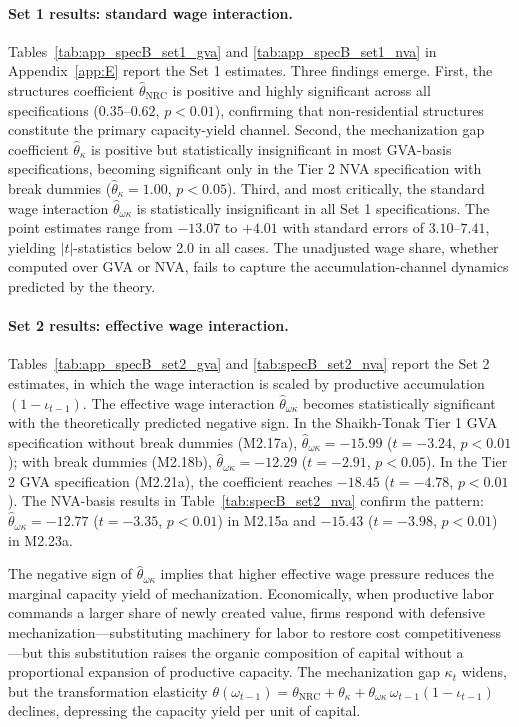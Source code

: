 \paragraph{Set 1 results: standard wage interaction.}
Tables~\ref{tab:app_specB_set1_gva} and
\ref{tab:app_specB_set1_nva} in Appendix~\ref{app:E} report the
Set 1 estimates. Three findings emerge. First, the structures
coefficient $\hat{\theta}_{\text{NRC}}$ is positive and highly
significant across all specifications ($0.35$--$0.62$,
$p < 0.01$), confirming that non-residential structures constitute
the primary capacity-yield channel. Second, the mechanization gap
coefficient $\hat{\theta}_{\kappa}$ is positive but statistically
insignificant in most GVA-basis specifications, becoming significant
only in the Tier 2 NVA specification with break dummies
($\hat{\theta}_{\kappa} = 1.00$, $p < 0.05$). Third, and most
critically, the standard wage interaction
$\hat{\theta}_{\omega\kappa}$ is statistically insignificant in all
Set 1 specifications. The point estimates range from $-13.07$ to
$+4.01$ with standard errors of $3.10$--$7.41$, yielding
$|t|$-statistics below 2.0 in all cases. The unadjusted wage share,
whether computed over GVA or NVA, fails to capture the
accumulation-channel dynamics predicted by the theory.

\paragraph{Set 2 results: effective wage interaction.}
Tables~\ref{tab:app_specB_set2_gva} and
\ref{tab:specB_set2_nva} report the Set 2 estimates, in which the
wage interaction is scaled by productive accumulation
$(1 - \iota_{t-1})$. The effective wage interaction
$\hat{\theta}_{\omega\kappa}$ becomes statistically significant
with the theoretically predicted negative sign. In the
Shaikh-Tonak Tier 1 GVA specification without break dummies
(M2.17a), $\hat{\theta}_{\omega\kappa} = -15.99$ ($t = -3.24$,
$p < 0.01$); with break dummies (M2.18b),
$\hat{\theta}_{\omega\kappa} = -12.29$ ($t = -2.91$,
$p < 0.05$). In the Tier 2 GVA specification (M2.21a), the
coefficient reaches $-18.45$ ($t = -4.78$, $p < 0.01$). The
NVA-basis results in Table~\ref{tab:specB_set2_nva} confirm the
pattern: $\hat{\theta}_{\omega\kappa} = -12.77$ ($t = -3.35$,
$p < 0.01$) in M2.15a and $-15.43$ ($t = -3.98$, $p < 0.01$) in
M2.23a.

The negative sign of $\hat{\theta}_{\omega\kappa}$ implies that
higher effective wage pressure reduces the marginal capacity yield
of mechanization. Economically, when productive labor commands a
larger share of newly created value, firms respond with defensive
mechanization---substituting machinery for labor to restore cost
competitiveness---but this substitution raises the organic
composition of capital without a proportional expansion of
productive capacity. The mechanization gap $\kappa_t$ widens, but
the transformation elasticity $\theta(\omega_{t-1}) =
\theta_{\text{NRC}} + \theta_{\kappa} +
\theta_{\omega\kappa}\,\omega_{t-1}(1-\iota_{t-1})$ declines,
depressing the capacity yield per unit of capital.


